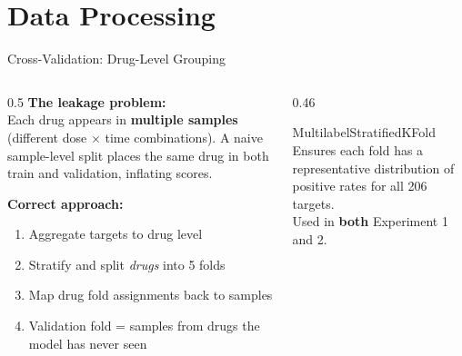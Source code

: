 \documentclass[aspectratio=169, 10pt]{beamer}
\begin{document}
\section{Data Processing}

\begin{frame}{Cross-Validation: Drug-Level Grouping}
  \begin{columns}[T]
    \begin{column}{0.5\textwidth}
      \textbf{The leakage problem:}\\[0.3em]
      Each drug appears in \textbf{multiple samples}
      (different dose $\times$ time combinations).
      A naive sample-level split places the same drug in
      both train and validation, inflating scores.

      \vspace{0.6em}
      \textbf{Correct approach:}
      \begin{enumerate}
        \item Aggregate targets to drug level
        \item Stratify and split \emph{drugs} into 5 folds
        \item Map drug fold assignments back to samples
        \item Validation fold = samples from drugs the model
              has never seen
      \end{enumerate}
    \end{column}
    \begin{column}{0.46\textwidth}
      \begin{block}{MultilabelStratifiedKFold}
        Ensures each fold has a representative distribution
        of positive rates for all 206 targets.\\[0.4em]
        Used in \textbf{both} Experiment 1 and 2.
      \end{block}
      \vspace{0.5em}
    \end{column}
  \end{columns}
\end{frame}
\end{document}
